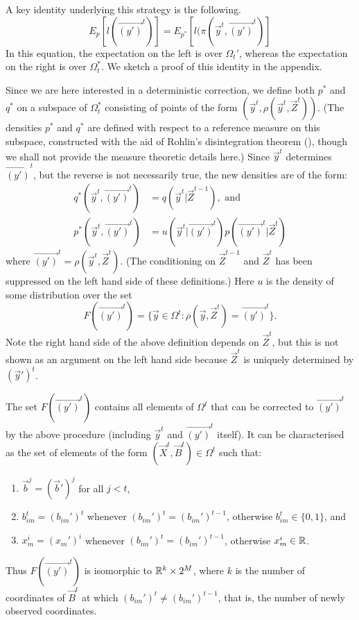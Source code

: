 A key identity underlying this strategy is the following.
\[
E_{p}[l(\vec{(y')}^{t})]  =  E_{p^*}[l(\pi (\vec{y}^{t}, \vec{(y')}^{t})]
\]
In this equation, the expectation on the left is over $\Omega_t'$, whereas the expectation on the right is over $\Omega_t^*$. We sketch a proof of this identity in the appendix.

Since we are here interested in a deterministic correction, we define both $p^*$ and $q^*$ on a subspace of $\Omega_t^*$ consisting of points of the form $(\vec{y}^{t}, \rho(\vec{y}^{t}, \vec{Z}^{t}))$. (The densities $p^*$ and $q^*$ are defined with respect to a reference measure on this subspace, constructed with the aid of Rohlin's disintegration theorem (\cite{Rohlin}), though we shall not provide the measure theoretic details here.) Since $\vec{y}^{t}$ determines $\vec{(y')}^{t}$, but the reverse is not necessarily true, the new densities are of the form:
\begin{align*}
q^*(\vec{y}^{t},\vec{(y')}^{t}) &= q(\vec{y}^{t} | \vec{Z}^{t-1}), \mbox{ and } \\
p^*(\vec{y}^{t},\vec{(y')}^{t}) &= u(\vec{y}^{t} | \vec{(y')}^{t}) p(\vec{(y')}^{t} | \vec{Z}^{t})
\end{align*}
where $\vec{(y')}^{t} = \rho(\vec{y}^{t}, \vec{Z}^{t})$. (The conditioning on $\vec{Z}^{t-1}$ and $\vec{Z}^{t}$ has been suppressed on the left hand side of these definitions.) Here $u$ is the density of some distribution over the set 
\[
F(\vec{(y')}^{t}) = \{ \vec{y} \in \Omega^t  :  \rho(\vec{y}, \vec{Z}^{t}) = \vec{(y')}^{t} \}.
\]
Note the right hand side of the above definition depends on $\vec{Z}^{t}$, but this is not shown as an argument on the left hand side because $\vec{Z}^{t}$ is uniquely determined by $(\vec{y}')^{t}$.

The set $F(\vec{(y')}^{t})$ contains all elements of $\Omega^t$ that can be corrected to $\vec{(y')}^{t}$ by the above procedure (including $\vec{y}^{t}$ and $\vec{(y')}^{t}$ itself). It can be characterised as the set of elements of the form $(\vec{X}^{t},\vec{B}^{t}) \in \Omega^t$ such that:
\begin{enumerate}
\item $\vec{b}^{j} = (\vec{b}')^{j}$ for all $j < t$,
\item $b_{im}^{t} = (b_{im}')^t$ whenever $(b_{im}')^t = (b_{im}')^{t-1}$, otherwise $b_{im}^{t} \in \{ 0, 1 \}$, and
\item $x_{m}^{i} = (x_{m}')^{i}$ whenever $(b_{im}')^t = (b_{im}')^{t-1}$, otherwise $x_{m}^{i} \in \mathbb R$.
\end{enumerate}
Thus $F(\vec{(y')}^{t})$ is isomorphic to $\mathbb R^k \times 2^M$, where $k$ is the number of coordinates of $\vec{B}^{t}$ at which $(b_{im}')^t \neq (b_{im}')^{t-1}$, that is, the number of newly observed coordinates.

